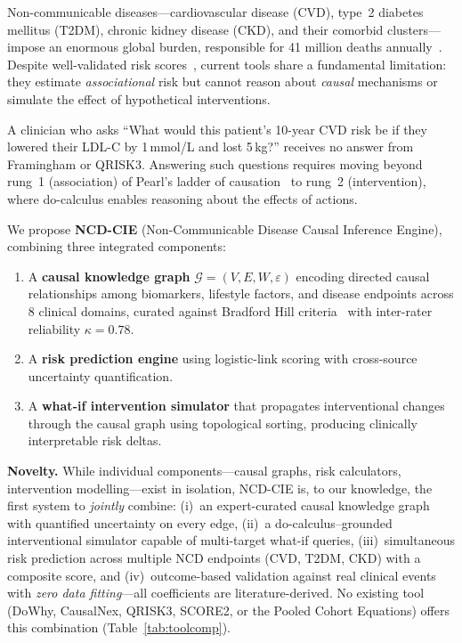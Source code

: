 \documentclass[runningheads]{llncs}
\begin{document}
Non-communicable diseases---cardiovascular disease (CVD), type~2
diabetes mellitus (T2DM), chronic kidney disease (CKD), and their
comorbid clusters---impose an enormous global burden, responsible for
41 million deaths annually~\cite{who2021ncd}.  Despite well-validated
risk scores~\cite{dagostino2008,hippisley2017qrisk3,score22021},
current tools share a fundamental limitation: they
estimate \emph{associational} risk but cannot reason about
\emph{causal} mechanisms or simulate the effect of hypothetical
interventions.

A clinician who asks ``What would this patient's 10-year CVD risk be
if they lowered their LDL-C by 1\,mmol/L and lost 5\,kg?'' receives
no answer from Framingham or QRISK3.  Answering such questions
requires moving beyond rung~1 (association) of Pearl's ladder of
causation~\cite{pearl2018book} to rung~2 (intervention), where
do-calculus enables reasoning about the effects of actions.

We propose \textbf{NCD-CIE} (Non-Communicable Disease Causal Inference
Engine), combining three integrated components:
\begin{enumerate}
\item A \textbf{causal knowledge graph} $\mathcal{G}=(V,E,W,\varepsilon)$
  encoding directed causal relationships among biomarkers, lifestyle
  factors, and disease endpoints across 8 clinical domains, curated
  against Bradford Hill criteria~\cite{hill1965environment} with
  inter-rater reliability $\kappa=0.78$.
\item A \textbf{risk prediction engine} using logistic-link scoring with
  cross-source uncertainty quantification.
\item A \textbf{what-if intervention simulator} that propagates
  interventional changes through the causal graph using topological
  sorting, producing clinically interpretable risk deltas.
\end{enumerate}

\noindent\textbf{Novelty.}
While individual components---causal graphs, risk calculators,
intervention modelling---exist in isolation, NCD-CIE is, to our
knowledge, the first system to \emph{jointly} combine: (i)~an
expert-curated causal knowledge graph with quantified uncertainty on
every edge, (ii)~a do-calculus--grounded interventional simulator
capable of multi-target what-if queries, (iii)~simultaneous risk
prediction across multiple NCD endpoints (CVD, T2DM, CKD) with a
composite score, and (iv)~outcome-based validation against real
clinical events with \emph{zero data fitting}---all coefficients are
literature-derived.  No existing tool (DoWhy, CausalNex, QRISK3,
SCORE2, or the Pooled Cohort Equations) offers this combination
(Table~\ref{tab:toolcomp}).
\end{document}
